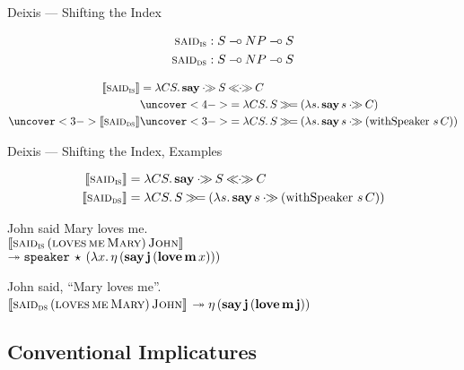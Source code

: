 \documentclass{beamer}
\begin{document}
\begin{frame}{Deixis --- Shifting the Index}
  
\begin{align*}
  \textsc{said}_{\textsc{is}} &: S \mathbin{{-}\mkern-3.5mu{\circ}} NP \mathbin{{-}\mkern-3.5mu{\circ}} S \\
  \textsc{said}_{\textsc{ds}} &: S \mathbin{{-}\mkern-3.5mu{\circ}} NP \mathbin{{-}\mkern-3.5mu{\circ}} S
\end{align*}

\pause

\begin{align*}
  \sem{\abs{said}_{\abs{is}}} &= \lam{C S}{\obj{say} \apr S \aplr C} \\
                              &\uncover<4->{= \lam{C S}{S \hsbind (\lam{s}{\ap{\obj{say}}{s} \apr C})}} \\
  \uncover<3->{\sem{\abs{said}_{\abs{ds}}}} &\uncover<3->{= \lam{C S}{S \hsbind (\lam{s}{\ap{\obj{say}}{s} \apr (\app{\withSpeaker}{s}{C})})}}
\end{align*}
\end{frame}


\begin{frame}{Deixis --- Shifting the Index, Examples}

\begin{align*}
  \sem{\abs{said}_{\abs{is}}} &= \lam{C S}{\obj{say} \apr S \aplr C} \\
  \sem{\abs{said}_{\abs{ds}}} &= \lam{C S}{S \hsbind (\lam{s}{\ap{\obj{say}}{s} \apr (\app{\withSpeaker}{s}{C})})}
\end{align*}

\pause
\vfill

  John said Mary loves me. \\
  $\llbracket \textsc{said}_{\textsc{is}}\,(\textsc{loves}\,\textsc{me}\,\textsc{Mary})\,\textsc{John} \rrbracket$ \\
  \hfill $\twoheadrightarrow \mathtt{speaker}\,\star\,(\lambda x.\, \eta\,(\textbf{say}\,\textbf{j}\,(\textbf{love}\,\textbf{m}\,x)))$

\pause
\vfill

  John said, ``Mary loves me''. \\
  $\llbracket \textsc{said}_{\textsc{ds}}\,(\textsc{loves}\,\textsc{me}\,\textsc{Mary})\,\textsc{John} \rrbracket$
  \hfill $\twoheadrightarrow \eta\,(\textbf{say}\,\textbf{j}\,(\textbf{love}\,\textbf{m}\,\textbf{j}))$
\end{frame}


\subsection{Conventional Implicatures}
\end{document}
